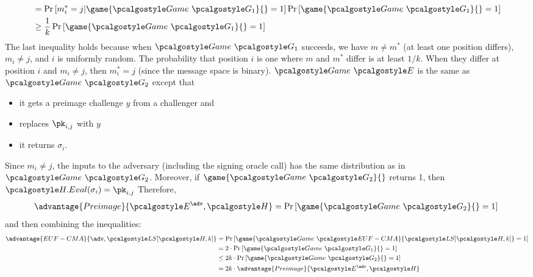\begin{enumerate}
\begin{align*}
        &= \pr{m^*_i = j | \game{\Game~\algo{G_1}}{} = 1} \pr{\game{\Game~\algo{G_1}}{} = 1} \\
        &\geq \frac{1}{k}\pr{\game{\Game~\algo{G_1}}{} = 1} \\
    \end{align*}
    The last inequality holds because when $\Game~\algo{G_1}$ succeeds, we have $m \neq m^*$ (at least one position differs), $m_i \neq j$, and $i$ is uniformly random. The probability that position $i$ is one where $m$ and $m^*$ differ is at least $1/k$. When they differ at position $i$ and $m_i \neq j$, then $m^*_i = j$ (since the message space is binary).
    $\Game~\algo{E}$ is the same as $\Game~\algo{G_2}$ except that
    \begin{itemize}
        \item it gets a preimage challenge $y$ from a challenger and
        \item replaces $\pk_{i, j}$ with $y$
        \item it returns $\sigma_i$.
    \end{itemize}
    Since $m_i \neq j$, the inputs to the adversary (including the signing oracle call) has the same distribution as in $\Game~\algo{G_2}$.
    Moreover, if $\game{\Game~\algo{G_2}}{}$ returns 1, then $\algo{H.Eval}(\sigma_i) = \pk_{i, j}$
    Therefore,
    \[
    \advantage{Preimage}{\algo{E}^\adv, \algo{H}} = \pr{\game{\Game~\algo{G_2}}{} = 1} \\
    \]
    and then combining the inequalities:
    \begin{align*}
      \advantage{EUF-CMA}{\adv, \algo{LS}[\algo{H, k}]} &= \pr{\game{\Game~\algo{EUF-CMA}}{\algo{LS[\algo{H}, k]}} = 1} \\
      &= 2 \cdot \pr{\game{\Game~\algo{G_1}}{} = 1} \\
      &\leq 2k \cdot \pr{\game{\Game~\algo{G_2}}{} = 1} \\
      &= 2k \cdot \advantage{Preimage}{\algo{E}^\adv, \algo{H}}
    \end{align*}
\end{enumerate}

